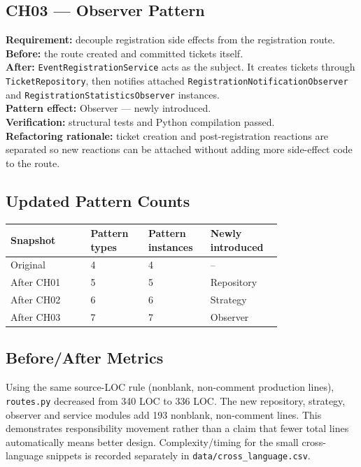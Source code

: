 \documentclass[11pt,a4paper]{article}
\begin{document}
\subsection{CH03 --- Observer Pattern}
\textbf{Requirement:} decouple registration side effects from the registration route.\\
\textbf{Before:} the route created and committed tickets itself.\\
\textbf{After:} \texttt{EventRegistrationService} acts as the subject. It creates tickets through \texttt{TicketRepository}, then notifies attached \texttt{RegistrationNotificationObserver} and \texttt{RegistrationStatisticsObserver} instances.\\
\textbf{Pattern effect:} Observer --- newly introduced.\\
\textbf{Verification:} structural tests and Python compilation passed.\\
\textbf{Refactoring rationale:} ticket creation and post-registration reactions are separated so new reactions can be attached without adding more side-effect code to the route.

\subsection{Updated Pattern Counts}
\begin{longtable}{p{0.25\linewidth}p{0.18\linewidth}p{0.16\linewidth}p{0.18\linewidth}}
\toprule
Snapshot & Pattern types & Pattern instances & Newly introduced\\
\midrule
Original & 4 & 4 & --\\
After CH01 & 5 & 5 & Repository\\
After CH02 & 6 & 6 & Strategy\\
After CH03 & 7 & 7 & Observer\\
\bottomrule
\end{longtable}

\subsection{Before/After Metrics}
Using the same source-LOC rule (nonblank, non-comment production lines), \texttt{routes.py} decreased from 340 LOC to 336 LOC. The new repository, strategy, observer and service modules add 193 nonblank, non-comment lines. This demonstrates responsibility movement rather than a claim that fewer total lines automatically means better design. Complexity/timing for the small cross-language snippets is recorded separately in \texttt{data/cross\_language.csv}.
\end{document}
